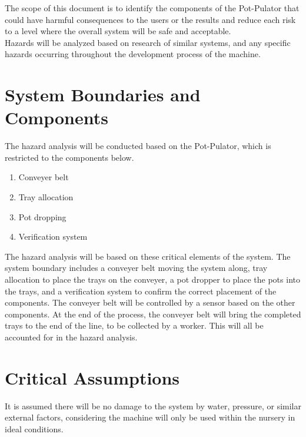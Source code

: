 \documentclass{article}
\begin{document}
\noindent The scope of this document is to identify the components of the Pot-Pulator that could have harmful consequences to the users or the results and reduce each risk to a level where the overall system will be safe and acceptable. 
\\

\noindent Hazards will be analyzed based on research of similar systems, and any specific hazards occurring throughout the development process of the machine. 

\section{System Boundaries and Components}

The hazard analysis will be conducted based on the Pot-Pulator, which is restricted to the components below. 


\begin{enumerate}
    \item Conveyer belt
    \item Tray allocation
    \item Pot dropping
    \item Verification system
\end{enumerate}

\noindent The hazard analysis will be based on these critical elements of the system. The system boundary includes a conveyer belt moving the system along, tray allocation to place the trays on the conveyer, a pot dropper to place the pots into the trays, and a verification system to confirm the correct placement of the components. 
\clearpage
\noindent The conveyer belt will be controlled by a sensor based on the other components. At the end of the process, the conveyer belt will bring the completed trays to the end of the line, to be collected by a worker. This will all be accounted for in the hazard analysis. 

\section{Critical Assumptions}

It is assumed there will be no damage to the system by water, pressure, or similar external factors, considering the machine will only be used within the nursery in ideal conditions.  
\end{document}
